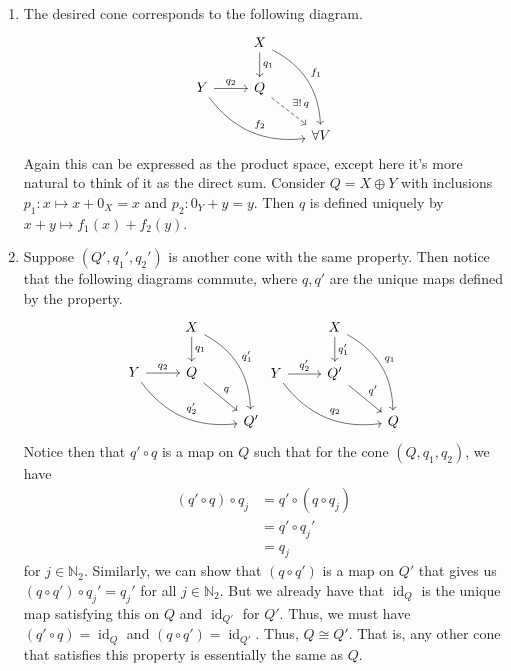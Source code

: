 \documentclass[letterpaper, 12pt]{hmcpset}
\begin{document}
\begin{solution}
\begin{enumerate}
		\item
			The desired cone corresponds to the following diagram.
			\[
				\begin{tikzcd}
						          & X \ar[d, "q_{1}"] \ar[rdd, "f_{1}", bend left] \\
					Y \ar[r, "q_{2}"] \ar[rrd, bend right, "f_{2}"] & Q \ar[rd, "\exists ! \, q", dashrightarrow] \\
							  & & \forall V 
				\end{tikzcd}
			\]
			Again this can be expressed as the product space, except here it's more natural to think of it as the direct sum. Consider $Q = X \oplus Y$ with inclusions $p_{1} : x \mapsto x + 0_{X} = x$ and $p_{2} : 0_{Y} + y = y$. Then $q$ is defined uniquely by $x + y \mapsto f_{1}(x) + f_{2}(y)$.
			
		\item
			Suppose $(Q', q_{1}', q_{2}')$ is another cone with the same property. Then notice that the following diagrams commute, where $q, q'$ are the unique maps defined by the property.
			\[
				\begin{tikzcd}
						          & X \ar[d, "q_{1}"] \ar[rdd, "q_{1}'", bend left] \\
					Y \ar[r, "q_{2}"] \ar[rrd, bend right, "q_{2}'"] & Q \ar[rd, "q"] \\
							  & & Q'
				\end{tikzcd}
				\begin{tikzcd}
						          & X \ar[d, "q_{1}'"] \ar[rdd, "q_{1}", bend left] \\
					Y \ar[r, "q_{2}'"] \ar[rrd, bend right, "q_{2}"] & Q' \ar[rd, "q'"] \\
							  & & Q
				\end{tikzcd}
			\]
			Notice then that $q' \circ q$ is a map on $Q$ such that for the cone $(Q, q_{1}, q_{2})$, we have 
			\[
				\begin{split}
					(q' \circ q) \circ q_{j} & = q' \circ (q \circ q_{j}) \\
								 & = q' \circ q_{j}' \\
								 & = q_{j}
				\end{split}
			\]
			for $j \in \mathbb{N}_{2}$. Similarly, we can show that $(q \circ q')$ is a map on $Q'$ that gives us $(q \circ q') \circ q_{j}' = q_{j}'$ for all $j \in \mathbb{N}_2$. But we already have that $\operatorname{id}_{Q}$ is the unique map satisfying this on $Q$ and $\operatorname{id}_{Q'}$ for $Q'$. Thus, we must have $(q' \circ q) = \operatorname{id}_{Q}$ and $(q \circ q') = \operatorname{id}_{Q'}$. Thus, $Q \cong Q'$. That is, any other cone that satisfies this property is essentially the same as $Q$.
	\end{enumerate}
\end{solution}
	
\end{document}
